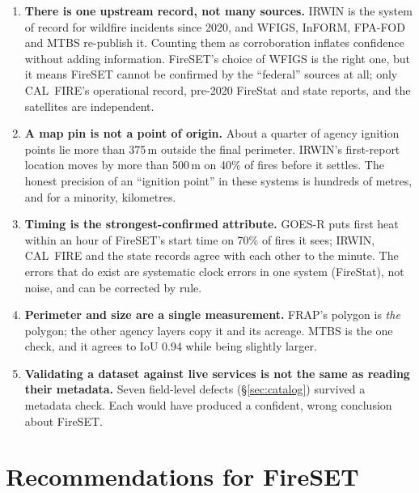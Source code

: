 \documentclass[11pt,a4paper]{article}
\begin{document}
\begin{enumerate}[leftmargin=*, itemsep=3pt]
\item \textbf{There is one upstream record, not many sources.} IRWIN is the system of record for wildfire
incidents since 2020, and WFIGS, InFORM, FPA-FOD and MTBS re-publish it. Counting them as corroboration
inflates confidence without adding information. FireSET's choice of WFIGS is the right one, but it means FireSET
cannot be confirmed by the ``federal'' sources at all; only CAL~FIRE's operational record, pre-2020 FireStat and
state reports, and the satellites are independent.
\item \textbf{A map pin is not a point of origin.} About a quarter of agency ignition points lie more than
375\,m outside the final perimeter. IRWIN's first-report location moves by more than 500\,m on 40\% of fires
before it settles. The honest precision of an ``ignition point'' in these systems is hundreds of metres, and
for a minority, kilometres.
\item \textbf{Timing is the strongest-confirmed attribute.} GOES-R puts first heat within an hour of FireSET's
start time on 70\% of fires it sees; IRWIN, CAL~FIRE and the state records agree with each other to the
minute. The errors that do exist are systematic clock errors in one system (FireStat), not noise, and can be
corrected by rule.
\item \textbf{Perimeter and size are a single measurement.} FRAP's polygon is \emph{the} polygon; the other
agency layers copy it and its acreage. MTBS is the one check, and it agrees to IoU 0.94 while being slightly
larger.
\item \textbf{Validating a dataset against live services is not the same as reading their metadata.} Seven
field-level defects (\S\ref{sec:catalog}) survived a metadata check. Each would have produced a confident,
wrong conclusion about FireSET.
\end{enumerate}

\section{Recommendations for FireSET}
\end{document}
